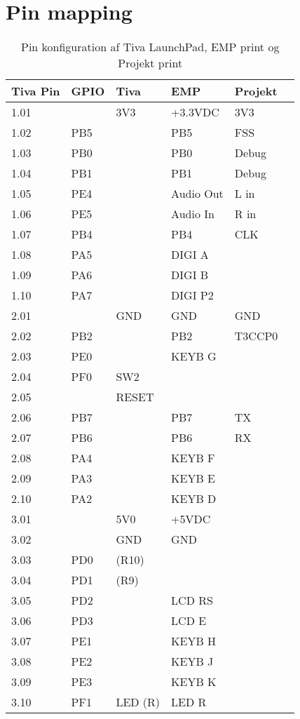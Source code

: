 \chapter{Pin mapping} \label{bilag:pinmap}
\begin{table}[h!]
	\caption{Pin konfiguration af Tiva LaunchPad, EMP print og Projekt print}
	\label{tab:pin_mapping}
	\begin{threeparttable}
		\begin{tabular}{l l l l l l}
			\toprule
			\textbf{Tiva Pin\tnote{a}} 	& 
			\textbf{GPIO\tnote{b}}  	&
			\textbf{Tiva\tnote{c}} 		& 
			\textbf{EMP\tnote{d}}  		&
			\textbf{Projekt\tnote{e}} 	\\ 
			\midrule
			1.01 &      & 3V3  	& +3.3VDC		& 3V3			 		\\
			1.02 &  PB5 &      	& PB5			& FSS		\\
			1.03 &	PB0 &	   	& PB0			& Debug							\\
			1.04 &	PB1 &      	& PB1			& Debug							\\
			1.05 &	PE4 &	   	& Audio Out     & L in						\\
			1.06 &	PE5 &	   	& Audio In		& R in							\\
			1.07 &	PB4 &	   	& PB4			& CLK		\\
			1.08 &	PA5 &	   	& DIGI A		& 					\\
			1.09 &	PA6 &	   	& DIGI B    	& 								\\
			1.10 &	PA7 &	   	& DIGI P2		& 								\\
			\midrule
			2.01 &     	& GND  	& GND  			& GND 						\\
			2.02 & PB2 	&      	& PB2			& T3CCP0							\\
			2.03 & PE0 	&	  	& KEYB G 		&								\\
			2.04 & PF0 	& SW2	& 				&								\\
			2.05 &     	& RESET	& 				&								\\
			2.06 & PB7	&		& PB7			& TX					\\
			2.07 & PB6	&		& PB6			& RX					\\
			2.08 & PA4 	&      	& KEYB F 		&						\\
			2.09 & PA3 	&		& KEYB E    	& 						\\
			2.10 & PA2  &		& KEYB D		& 						\\
			\midrule
			3.01 &		& 5V0	& +5VDC			&								\\
			3.02 &		& GND	& GND			&								\\
			3.03 & PD0	&(R10)	&				&								\\
			3.04 & PD1	&(R9)	&				&								\\
			3.05 & PD2	&		& LCD RS		& 				\\
			3.06 & PD3	&		& LCD E			& 						\\
			3.07 & PE1	&		& KEYB H		& 							\\
			3.08 & PE2	&		& KEYB J		&							\\
			3.09 & PE3	&		& KEYB K		&								\\
			3.10 & PF1	&LED (R)& LED R			&								\\
			\bottomrule
		\end{tabular}
	

\end{threeparttable}
\end{table}
